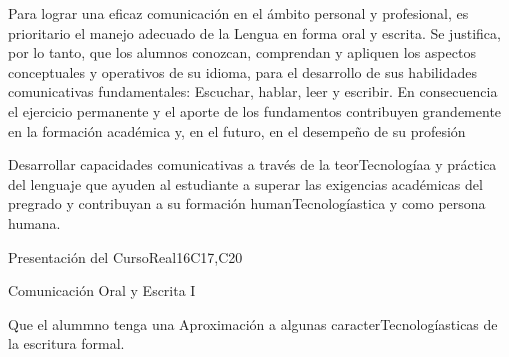 \begin{syllabus}


\begin{justification}
Para lograr una eficaz comunicación en el ámbito personal y profesional, es prioritario el manejo adecuado de la Lengua en forma oral y escrita. Se justifica, por lo tanto, que los alumnos  conozcan, comprendan y apliquen los aspectos conceptuales y operativos de su idioma, para el desarrollo de sus habilidades comunicativas fundamentales: Escuchar, hablar, leer y escribir.
En consecuencia el ejercicio permanente y el aporte de los fundamentos contribuyen grandemente en la formación académica y, en el futuro, en el desempeño de su profesión
\end{justification}

\begin{goals}
\item Desarrollar capacidades comunicativas a través de la teorTecnologíaa y práctica del lenguaje que ayuden al estudiante a superar las exigencias académicas del pregrado y contribuyan a su formación humanTecnologíastica y como persona humana.
\end{goals}

\begin{outcomes}
   \item {}
   \item {}
   \item {}
\end{outcomes}

\begin{competences}
    \item {}
    \item {}
    \item {}
\end{competences}

\begin{unit}{Presentación del Curso}{}{Real}{16}{C17,C20}
  \begin{topics}
      \item Comunicación Oral y Escrita I
  \end{topics}

  \begin{learningoutcomes}
   \item Que el alummno tenga una Aproximación a algunas caracterTecnologíasticas de la escritura formal.
  \end{learningoutcomes}
\end{unit}


\end{syllabus}
